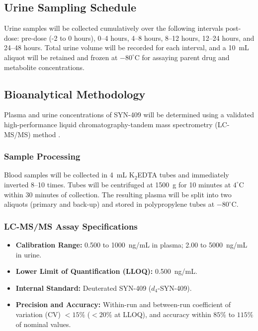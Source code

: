 \subsection{Urine Sampling Schedule}

Urine samples will be collected cumulatively over the following intervals post-dose: pre-dose (-2 to 0 hours), 0--4 hours, 4--8 hours, 8--12 hours, 12--24 hours, and 24--48 hours. Total urine volume will be recorded for each interval, and a 10~mL aliquot will be retained and frozen at $-80^{\circ}$C for assaying parent drug and metabolite concentrations.

\subsection{Bioanalytical Methodology}

Plasma and urine concentrations of SYN-409 will be determined using a validated high-performance liquid chromatography-tandem mass spectrometry (LC-MS/MS) method \citep{zhao2025validation}. 

\subsubsection{Sample Processing}
Blood samples will be collected in 4~mL K$_2$EDTA tubes and immediately inverted 8--10 times. Tubes will be centrifuged at 1500~g for 10 minutes at $4^{\circ}$C within 30 minutes of collection. The resulting plasma will be split into two aliquots (primary and back-up) and stored in polypropylene tubes at $-80^{\circ}$C.

\subsubsection{LC-MS/MS Assay Specifications}
\begin{itemize}
  \item \textbf{Calibration Range:} 0.500 to 1000~ng/mL in plasma; 2.00 to 5000~ng/mL in urine.
  \item \textbf{Lower Limit of Quantification (LLOQ):} 0.500~ng/mL.
  \item \textbf{Internal Standard:} Deuterated SYN-409 ($d_4$-SYN-409).
  \item \textbf{Precision and Accuracy:} Within-run and between-run coefficient of variation (CV) $< 15\%$ ($< 20\%$ at LLOQ), and accuracy within $85\%$ to $115\%$ of nominal values.
\end{itemize}
